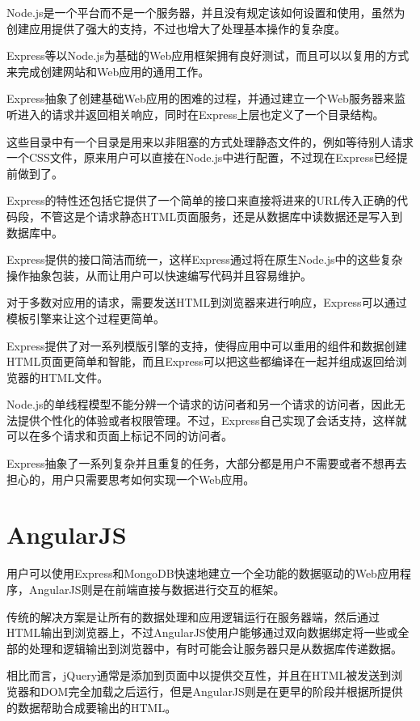 Node.js是一个平台而不是一个服务器，并且没有规定该如何设置和使用，虽然为创建应用提供了强大的支持，不过也增大了处理基本操作的复杂度。

Express等以Node.js为基础的Web应用框架拥有良好测试，而且可以以复用的方式来完成创建网站和Web应用的通用工作。

Express抽象了创建基础Web应用的困难的过程，并通过建立一个Web服务器来监听进入的请求并返回相关响应，同时在Express上层也定义了一个目录结构。

这些目录中有一个目录是用来以非阻塞的方式处理静态文件的，例如等待别人请求一个CSS文件，原来用户可以直接在Node.js中进行配置，不过现在Express已经提前做到了。

Express的特性还包括它提供了一个简单的接口来直接将进来的URL传入正确的代码段，不管这是个请求静态HTML页面服务，还是从数据库中读数据还是写入到数据库中。

Express提供的接口简洁而统一，这样Express通过将在原生Node.js中的这些复杂操作抽象包装，从而让用户可以快速编写代码并且容易维护。

对于多数对应用的请求，需要发送HTML到浏览器来进行响应，Express可以通过模板引擎来让这个过程更简单。

Express提供了对一系列模版引擎的支持，使得应用中可以重用的组件和数据创建HTML页面更简单和智能，而且Express可以把这些都编译在一起并组成返回给浏览器的HTML文件。

Node.js的单线程模型不能分辨一个请求的访问者和另一个请求的访问者，因此无法提供个性化的体验或者权限管理。不过，Express自己实现了会话支持，这样就可以在多个请求和页面上标记不同的访问者。

Express抽象了一系列复杂并且重复的任务，大部分都是用户不需要或者不想再去担心的，用户只需要思考如何实现一个Web应用。


\section{AngularJS}

用户可以使用Express和MongoDB快速地建立一个全功能的数据驱动的Web应用程序，AngularJS则是在前端直接与数据进行交互的框架。

传统的解决方案是让所有的数据处理和应用逻辑运行在服务器端，然后通过HTML输出到浏览器上，不过AngularJS使用户能够通过双向数据绑定将一些或全部的处理和逻辑输出到浏览器中，有时可能会让服务器只是从数据库传递数据。

相比而言，jQuery通常是添加到页面中以提供交互性，并且在HTML被发送到浏览器和DOM完全加载之后运行，但是AngularJS则是在更早的阶段并根据所提供的数据帮助合成要输出的HTML。

